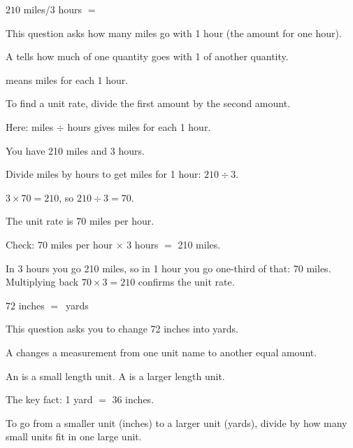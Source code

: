 
$210$ miles/$3$ hours $= $\ansblank


This question asks how many miles go with 1 hour (the amount for one hour).

\begin{words}
  \item A tells how much of one quantity goes with 1 of another
        quantity.
  \item {}means miles for each 1 hour.
  \item To find a unit rate, divide the first amount by the second amount.
  \item Here: miles $\div$ hours gives miles for each 1 hour.
\end{words}

\begin{steps}
  \item You have 210 miles and 3 hours.
  \item Divide miles by hours to get miles for 1 hour: $210 \div 3$.
  \item $3 \times 70 = 210$, so $210 \div 3 = 70$.
  \item The unit rate is 70 miles per hour.
  \item Check: 70 miles per hour $\times$ 3 hours $=$ 210 miles.
\end{steps}


In 3 hours you go 210 miles, so in 1 hour you go one-third of that: 70 miles.
Multiplying back $70 \times 3 = 210$ confirms the unit rate.


$72$ inches $= $\ansblank\ yards


This question asks you to change 72 inches into yards.

\begin{words}
  \item A changes a measurement from one unit name to
        another equal amount.
  \item An is a small length unit. A is a larger length
        unit.
  \item The key fact: 1 yard $=$ 36 inches.
  \item To go from a smaller unit (inches) to a larger unit (yards), divide by
        how many small units fit in one large unit.
\end{words}

